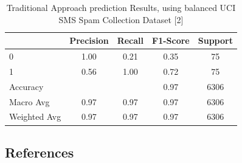 \documentclass{article}
\begin{document}
\begin{table}[htbp]
    \centering
    \caption{Traditional Approach prediction Results, using balanced UCI SMS Spam Collection Dataset [2]}
    \begin{tabular}{l c c c c}
    \toprule
     & Precision & Recall & F1-Score & Support \\
    \midrule
    0 & 1.00 & 0.21 & 0.35 & 75 \\
    1 & 0.56 & 1.00 & 0.72 & 75 \\
    \midrule
    Accuracy & & & 0.97 & 6306 \\
    Macro Avg & 0.97 & 0.97 & 0.97 & 6306 \\
    Weighted Avg & 0.97 & 0.97 & 0.97 & 6306 \\
    \bottomrule
    \end{tabular}
    \label{tab:classification_report_4}
\end{table}

\newpage

\noindent


\subsection*{References}
\end{document}
